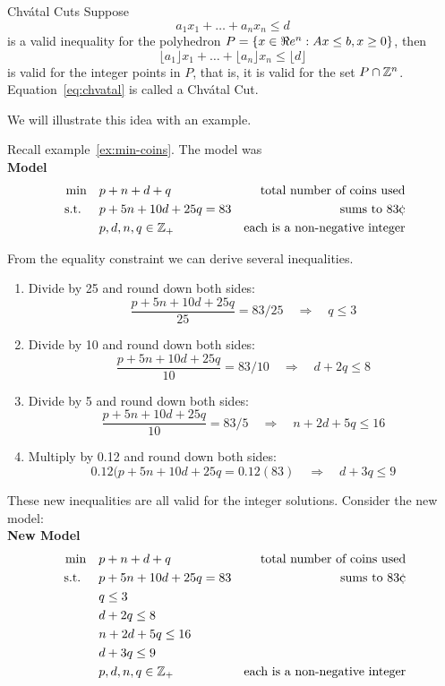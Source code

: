\begin{general}{Chv\'atal Cuts}{}
Suppose 
\begin{equation}
a_1 x_1 + \dots + a_n x_n \leq d
\end{equation}
is a valid inequality for the polyhedron $P = \{ x \in \Re e^n : Ax \leq b, x \geq 0\}$, then 
\begin{equation}
\label{eq:chvatal}
\lfloor a_1\rfloor x_1 + \dots + \lfloor a_n\rfloor  x_n \leq \lfloor d\rfloor
\end{equation}
is valid for the integer points in $P$, that is, it is valid for the set $P \cap {\mathbb{Z}}^n$.  Equation~\eqref{eq:chvatal} is called a Chv\'atal Cut.
\end{general}


We will illustrate this idea with an example.


\begin{example}{}{}
Recall example~\ref{ex:min-coins}.  The model was\\
\textbf{Model}
\begin{align*}
\min \quad & p + n + d + q & \text{ total number of coins used}\\
\text{ s.t. } \quad & p + 5n + 10d + 25 q = 83 & \text{sums to } 83 \cent\\
& p,d,n,q \in \Z_+ & \text{each is a non-negative integer}
\end{align*}

From the equality constraint we can derive several inequalities.
\begin{enumerate}
\item Divide by 25 and round down both sides:
\[
\frac{p + 5n + 10d + 25 q}{25} = 83/25 \quad \Rightarrow \quad q \leq 3 
\]
\item Divide by 10 and round down both sides:
\[
\frac{p + 5n + 10d + 25 q}{10} = 83/10 \quad \Rightarrow \quad d + 2q \leq 8 
\]
\item Divide by 5 and round down both sides:
\[
\frac{p + 5n + 10d + 25 q}{10} = 83/5 \quad \Rightarrow \quad n + 2d  + 5q \leq 16
\]
\item Multiply by 0.12 and round down both sides:
\[
0.12(p + 5n + 10d + 25 q = 0.12 (83) \quad \Rightarrow \quad d  + 3q \leq 9
\]
\end{enumerate}
These new inequalities are all valid for the integer solutions.  Consider the new model:\\

\textbf{New Model}
\begin{align*}
\min \quad & p + n + d + q & \text{ total number of coins used}\\
\text{ s.t. } \quad & p + 5n + 10d + 25 q = 83 & \text{sums to } 83 \cent\\
& q \leq 3\\
& d + 2q \leq 8 \\
& n + 2d  + 5q \leq 16\\
& d  + 3q \leq 9\\
& p,d,n,q \in \Z_+ & \text{each is a non-negative integer}
\end{align*}


\end{example}

